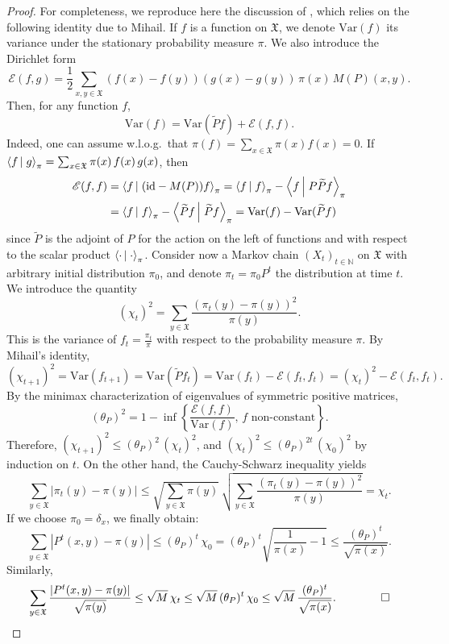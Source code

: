 \documentclass[envcountsame]{svmult}
\newcommand{\N}{\mathbb{N}}
\newcommand{\spa}{\mathfrak{X}}
\newcommand{\id}{\mathrm{id}}
\newcommand{\var}{\mathrm{Var}}
\newcommand{\scal}[2]{\left\langle #1\vphantom{#2}\,\right |\left.#2 \vphantom{#1}\right\rangle}
\begin{document}
\begin{proof}
For completeness, we reproduce here the discussion of \cite[Section 2]{Fil91}, which relies on the following identity due to Mihail.
If $f$ is a function on $\spa$, we denote $\var(f)$ its variance under the stationary probability measure $\pi$. We also introduce the Dirichlet form
$$\mathscr{E}(f,g) = \frac{1}{2}\sum_{x,y\in \spa} (f(x)-f(y))(g(x)-g(y))\,\pi(x)\,M(P)(x,y).$$ 
Then, for any function $f$,
$$\var(f) = \var(\widetilde{P}f) + \mathscr{E}(f,f).$$
Indeed, one can assume w.l.o.g.~that $\pi(f)=\sum_{x\in \spa}\pi(x)f(x)=0$. If $\scal{f}{g}_{\pi} = \sum_{x\in\spa} \pi(x)\,f(x)\,g(x)$, then
\begin{align*}
\mathscr{E}(f,f) &= \scal{f}{(\id - M(P))f}_\pi = \scal{f}{f}_\pi - \scal{f}{P\widetilde{P}f}_\pi \\
&=\scal{f}{f}_\pi - \scal{\widetilde{P}f}{\widetilde{P}f}_\pi = \var(f)-\var(\widetilde{P}f)
\end{align*}
since $\widetilde{P}$ is the adjoint of $P$ for the action on the left of functions and with respect to the scalar product $\scal{\cdot}{\cdot}_\pi$. Consider now a Markov chain $(X_t)_{t \in \N}$ on $\spa$ with arbitrary initial distribution $\pi_0$, and denote $\pi_t = \pi_0P^t$ the distribution at time $t$. We introduce the quantity 
$$(\chi_t)^2 = \sum_{y \in \spa} \frac{(\pi_t(y)-\pi(y))^2}{\pi(y)}.$$
This is the variance of $f_t=\frac{\pi_t}{\pi}$ with respect to the probability measure $\pi$. By Mihail's identity,
$$(\chi_{t+1})^2 = \var(f_{t+1})=\var(\widetilde{P}f_t) =\var(f_t) - \mathscr{E}(f_t,f_t) = (\chi_t)^2 - \mathscr{E}(f_t,f_t). $$
By the minimax characterization of eigenvalues of symmetric positive matrices, 
$$(\theta_P)^2 = 1-\inf\left\{ \frac{\mathscr{E}(f,f)}{\var(f)},\,f\text{ non-constant}\right\}.$$
Therefore, $(\chi_{t+1})^2 \leq (\theta_P)^2\,(\chi_t)^2$, and $(\chi_t)^2 \leq (\theta_P)^{2t}\,(\chi_0)^2$ by induction on $t$. On the other hand, the Cauchy-Schwarz inequality yields
$$\sum_{y \in \spa} |\pi_t(y)-\pi(y)| \leq \sqrt{\sum_{y\in \spa} \pi(y)}\,\sqrt{\sum_{y \in \spa} \frac{(\pi_t(y)-\pi(y))^2}{\pi(y)}} = \chi_t.$$
If we choose $\pi_0=\delta_x$, we finally obtain:
\begin{equation*}
\sum_{y \in \spa} |P^t(x,y)-\pi(y)| \leq (\theta_P)^t\,\chi_0 = (\theta_P)^t \sqrt{\frac{1}{\pi(x)}-1} \leq \frac{(\theta_P)^t}{\sqrt{\pi(x)}}.
\end{equation*}
Similarly, 
\begin{equation*}\sum_{y \in \spa} \frac{|P^t(x,y)-\pi(y)| }{\sqrt{\pi(y)}} \leq \sqrt{M}\,\chi_t \leq \sqrt{M}\,(\theta_P)^t\,\chi_0 \leq \sqrt{M}\,\frac{(\theta_P)^t}{\sqrt{\pi(x)}}.\qquad\qed
\end{equation*}
\end{proof}
\end{document}
